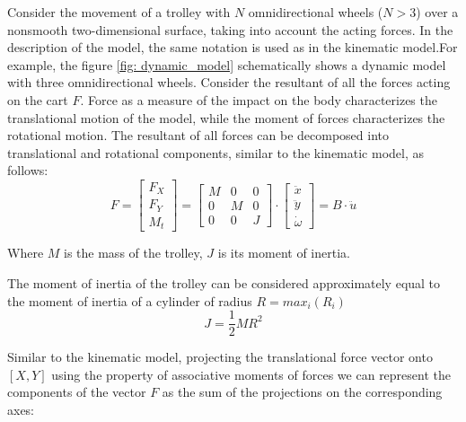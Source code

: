 \documentclass[oneside,final,14pt]{extreport}
\begin{document}
Consider the movement of a trolley with $ N $ omnidirectional wheels ($ N> 3 $) over a nonsmooth two-dimensional surface, taking into account the acting forces. In the description of the model, the same notation is used as in the kinematic model.For example, the figure \ref{fig: dynamic_model} schematically shows a dynamic model with three omnidirectional wheels. Consider the resultant of all the forces acting on the cart $ F $. Force as a measure of the impact on the body characterizes the translational motion of the model, while the moment of forces characterizes the rotational motion. The resultant of all forces can be decomposed into translational and rotational components, similar to the kinematic model, as follows:
\begin{equation}
F
=
\begin{bmatrix}
F_{X} \\
F_{Y} \\
M_{t}
\end{bmatrix}
=
\begin{bmatrix}
M & 0 & 0 \\
0 & M & 0 \\
0 & 0 & J
\end{bmatrix}
\cdot
\begin{bmatrix}
\ddot{x} \\
\ddot{y} \\
\dot{\omega}
\end{bmatrix}
=
B \cdot \ddot{u}
\end{equation}

Where $ M $ is the mass of the trolley, $ J $ is its moment of inertia.

\begin{figure} [H]

\end{figure}
The moment of inertia of the trolley can be considered approximately equal to the moment of inertia of a cylinder of radius $ R = max_{i} (R_{i}) $
\begin{equation}
J
=
\frac{1}{2}
MR ^{2}
\end{equation}



Similar to the kinematic model,
projecting the translational force vector onto $ [X, Y] $ using the property of associative moments of forces
we can represent the components of the vector $ F $ as the sum of the projections on the corresponding axes:
\end{document}
